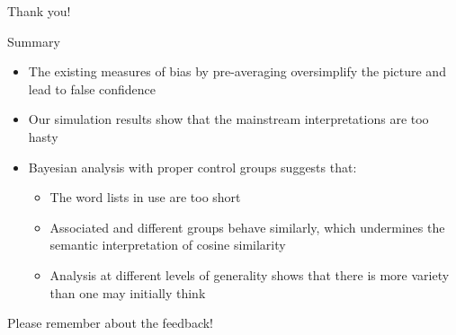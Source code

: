 \documentclass[
  10pt,
  ignorenonframetext,
  x11names, dvipsnames, bibspacing,natbib, table]{beamer}
\providecommand{\tightlist}{%
  \setlength{\itemsep}{0pt}\setlength{\parskip}{0pt}}
\begin{document}
\begin{frame}{Thank you!}
\protect\hypertarget{thank-you}{}
\begin{block}{Summary}
\protect\hypertarget{summary}{}
\pause

\begin{itemize}
\tightlist
\item
  The existing measures of bias by pre-averaging oversimplify the
  picture and lead to false confidence
\end{itemize}

\pause

\begin{itemize}
\tightlist
\item
  Our simulation results show that the mainstream interpretations are
  too hasty
\end{itemize}

\pause

\begin{itemize}
\item
  Bayesian analysis with proper control groups suggests that:

  \begin{itemize}
  \tightlist
  \item
    The word lists in use are too short
  \item
    Associated and different groups behave similarly, which undermines
    the semantic interpretation of cosine similarity
  \item
    Analysis at different levels of generality shows that there is more
    variety than one may initially think
  \end{itemize}
\end{itemize}

\pause
\end{block}

\begin{block}{Please remember about the feedback!}
\protect\hypertarget{please-remember-about-the-feedback}{}
\end{block}
\end{frame}
\end{document}

